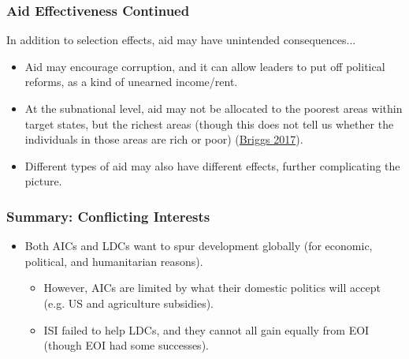 \documentclass{beamer}
\begin{document}
\begin{frame} 
	\frametitle{\LARGE{Aid Effectiveness Continued}}
In addition to selection effects, aid may have unintended consequences...
	\begin{itemize}
		\item Aid may encourage corruption, and it can allow leaders to put off political reforms, as a kind of unearned income/rent. \pause
		\item At the subnational level, aid may not be allocated to the poorest areas within target states, but the richest areas (though this does not tell us whether the individuals in those areas are rich or poor) (\href{https://static1.squarespace.com/static/5acc1ee17e3c3a103525fb2b/t/5acd1cbe352f53f7b76961d2/1523391678922/Briggs+\%282017\%29+Aid+Target+Poorest.pdf}{Briggs 2017}).
		\item Different types of aid may also have different effects, further complicating the picture.
	\end{itemize}
\end{frame}

\begin{frame} 
	\frametitle{\LARGE{Summary: Conflicting Interests}}
	\begin{itemize}
		\item Both AICs and LDCs want to spur development globally (for economic, political, and humanitarian reasons). \pause 
		\begin{itemize}
			\item However, AICs are limited by what their domestic politics will accept (e.g. US and agriculture subsidies). \pause 
			\item ISI failed to help LDCs, and they cannot all gain equally from EOI (though EOI had some successes).  
		\end{itemize}
	\end{itemize}
\end{frame}
\end{document}
